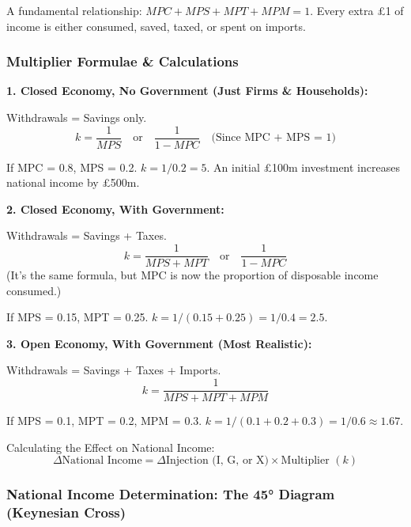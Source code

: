 \documentclass[11pt, a4paper, twoside]{book}
\begin{document}
\begin{coreidea}
A fundamental relationship: $MPC + MPS + MPT + MPM = 1$. Every extra £1 of income is either consumed, saved, taxed, or spent on imports.
\end{coreidea}

\subsubsection{Multiplier Formulae \& Calculations}

\textbf{1. Closed Economy, No Government (Just Firms \& Households):}

Withdrawals = Savings only.
\[ k = \frac{1}{MPS} \quad \text{or} \quad \frac{1}{1 - MPC} \quad \text{(Since MPC + MPS = 1)} \]

\begin{example}[]
If MPC = 0.8, MPS = 0.2. $k = 1/0.2 = 5$. An initial £100m investment increases national income by £500m.
\end{example}

\textbf{2. Closed Economy, With Government:}

Withdrawals = Savings + Taxes.
\[ k = \frac{1}{MPS + MPT} \quad \text{or} \quad \frac{1}{1 - MPC} \]
(It's the same formula, but MPC is now the proportion of disposable income consumed.)
\begin{example}[]
If MPS = 0.15, MPT = 0.25. $k = 1/(0.15 + 0.25) = 1/0.4 = 2.5$.
\end{example}

\textbf{3. Open Economy, With Government (Most Realistic):}

Withdrawals = Savings + Taxes + Imports.
\[ k = \frac{1}{MPS + MPT + MPM} \]
\begin{example}[]
If MPS = 0.1, MPT = 0.2, MPM = 0.3. $k = 1/(0.1+0.2+0.3) = 1/0.6 \approx 1.67$.
\end{example}

Calculating the Effect on National Income:
\[ \Delta \text{National Income} = \Delta \text{Injection (I, G, or X)} \times \text{Multiplier } (k) \]

\subsubsection{National Income Determination: The 45° Diagram (Keynesian Cross)}
\end{document}
